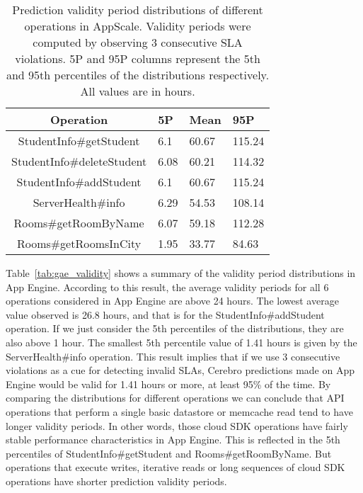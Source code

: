 
\begin{table}[htdp]
\caption{Prediction validity period distributions of different operations in AppScale. Validity periods were computed by observing 3 consecutive SLA violations. 5P and 95P columns represent the 5th and 95th percentiles of the
distributions respectively. All values are in hours.}
\begin{center}
\begin{tabular}{|c|p{1cm}|p{1cm}|p{1cm}|}
\hline
Operation & 5P & Mean & 95P \\ \hline
StudentInfo\#getStudent & 6.1 & 60.67 & 115.24 \\ \hline
StudentInfo\#deleteStudent & 6.08 & 60.21 & 114.32 \\ \hline
StudentInfo\#addStudent & 6.1 & 60.67 & 115.24 \\ \hline
ServerHealth\#info & 6.29 & 54.53 & 108.14 \\ \hline
Rooms\#getRoomByName & 6.07 & 59.18 & 112.28 \\ \hline
Rooms\#getRoomsInCity & 1.95 & 33.77 & 84.63 \\ \hline
\end{tabular}
\end{center}
\label{tab:as_validity}
\end{table}

Table~\ref{tab:gae_validity} shows a summary of the validity period distributions in App Engine. 
According to this result, the average validity periods for all 6 operations considered in App Engine are
above 24 hours. The lowest average value observed is 26.8 hours, and that is for the StudentInfo\#addStudent operation. If we
just consider the 5th percentiles of the distributions, they are also above 1 hour. The smallest 5th percentile value of 1.41 hours is 
given by the ServerHealth\#info operation. This result implies that if we use 3 consecutive violations as a cue for detecting invalid SLAs,
Cerebro predictions made on App Engine would be valid for 1.41 hours or more, at least 95\% of the time.
By comparing the distributions for different operations we can conclude that API operations that perform a single basic datastore or
memcache read tend to have longer validity periods. In other words, those cloud SDK operations have fairly stable performance
characteristics in App Engine. This is reflected in the 5th percentiles of StudentInfo\#getStudent and
Rooms\#getRoomByName. But operations that execute writes, iterative
reads or long sequences of cloud SDK operations have shorter prediction validity periods.

